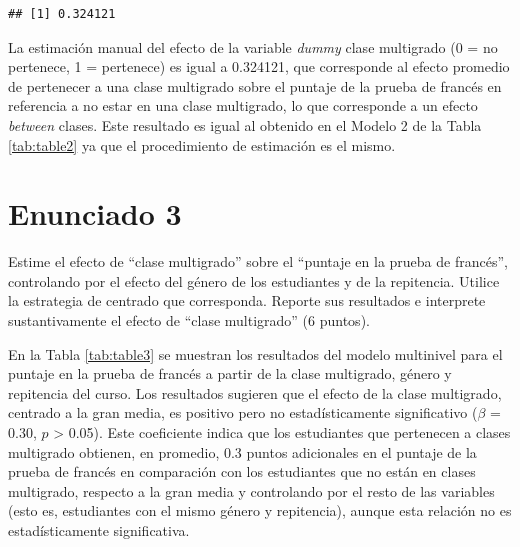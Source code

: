 \documentclass[
  12pt,
  a4paper,
]{article}
\begin{document}
\begin{verbatim}
## [1] 0.324121
\end{verbatim}

La estimación manual del efecto de la variable \emph{dummy} clase multigrado (0 = no pertenece, 1 = pertenece) es igual a 0.324121, que corresponde al efecto promedio de pertenecer a una clase multigrado sobre el puntaje de la prueba de francés en referencia a no estar en una clase multigrado, lo que corresponde a un efecto \emph{between} clases. Este resultado es igual al obtenido en el Modelo 2 de la Tabla \ref{tab:table2} ya que el procedimiento de estimación es el mismo.

\hypertarget{enunciado-3}{%
\section{Enunciado 3}\label{enunciado-3}}

Estime el efecto de ``clase multigrado'' sobre el ``puntaje en la prueba de francés'', controlando por el efecto del género de los estudiantes y de la repitencia. Utilice la estrategia de centrado que corresponda. Reporte sus resultados e interprete sustantivamente el efecto de ``clase multigrado'' (6 puntos).

En la Tabla \ref{tab:table3} se muestran los resultados del modelo multinivel para el puntaje en la prueba de francés a partir de la clase multigrado, género y repitencia del curso. Los resultados sugieren que el efecto de la clase multigrado, centrado a la gran media, es positivo pero no estadísticamente significativo (\(\beta\) = 0.30, \(p\) \textgreater{} 0.05). Este coeficiente indica que los estudiantes que pertenecen a clases multigrado obtienen, en promedio, 0.3 puntos adicionales en el puntaje de la prueba de francés en comparación con los estudiantes que no están en clases multigrado, respecto a la gran media y controlando por el resto de las variables (esto es, estudiantes con el mismo género y repitencia), aunque esta relación no es estadísticamente significativa.
\end{document}
